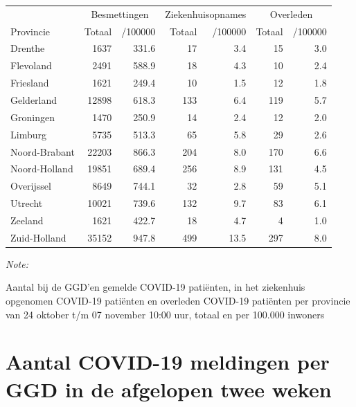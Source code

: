\documentclass[
  english,
  man,floatsintext]{apa6}
\begin{document}
\begin{table}[H]
\centering
\begin{threeparttable}
\begin{tabular}{lrrrrrr}
\toprule
\multicolumn{1}{c}{ } & \multicolumn{2}{c}{Besmettingen} & \multicolumn{2}{c}{Ziekenhuisopnames} & \multicolumn{2}{c}{Overleden} \\
\cmidrule(l{3pt}r{3pt}){2-3} \cmidrule(l{3pt}r{3pt}){4-5} \cmidrule(l{3pt}r{3pt}){6-7}
Provincie & Totaal & /100000 & Totaal & /100000 & Totaal & /100000\\
\midrule
Drenthe & 1637 & 331.6 & 17 & 3.4 & 15 & 3.0\\
Flevoland & 2491 & 588.9 & 18 & 4.3 & 10 & 2.4\\
Friesland & 1621 & 249.4 & 10 & 1.5 & 12 & 1.8\\
Gelderland & 12898 & 618.3 & 133 & 6.4 & 119 & 5.7\\
Groningen & 1470 & 250.9 & 14 & 2.4 & 12 & 2.0\\
Limburg & 5735 & 513.3 & 65 & 5.8 & 29 & 2.6\\
Noord-Brabant & 22203 & 866.3 & 204 & 8.0 & 170 & 6.6\\
Noord-Holland & 19851 & 689.4 & 256 & 8.9 & 131 & 4.5\\
Overijssel & 8649 & 744.1 & 32 & 2.8 & 59 & 5.1\\
Utrecht & 10021 & 739.6 & 132 & 9.7 & 83 & 6.1\\
Zeeland & 1621 & 422.7 & 18 & 4.7 & 4 & 1.0\\
Zuid-Holland & 35152 & 947.8 & 499 & 13.5 & 297 & 8.0\\
\bottomrule
\end{tabular}
\begin{tablenotes}
\item \textit{Note: } 
\item Aantal bij de GGD’en gemelde COVID-19 patiënten, in het ziekenhuis opgenomen COVID-19 patiënten en overleden COVID-19 patiënten per provincie van 24 oktober t/m 07 november 10:00 uur, totaal en per 100.000 inwoners
\end{tablenotes}
\end{threeparttable}
\end{table}

\newpage

\hypertarget{aantal-covid-19-meldingen-per-ggd-in-de-afgelopen-twee-weken}{%
\section{Aantal COVID-19 meldingen per GGD in de afgelopen twee weken}\label{aantal-covid-19-meldingen-per-ggd-in-de-afgelopen-twee-weken}}
\end{document}
